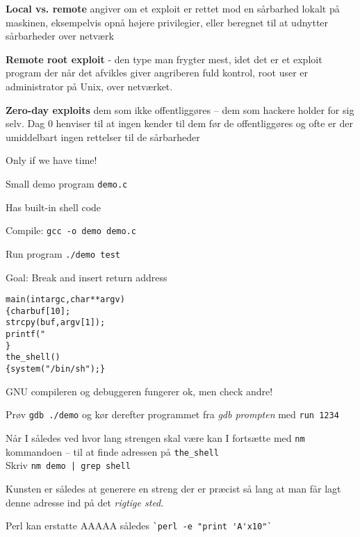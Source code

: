 \documentclass[Screen16to9,17pt]{foils}
\begin{document}
\begin{list1}
\item {\bfseries Local vs. remote}
angiver om et exploit er rettet mod
en sårbarhed lokalt på maskinen, eksempelvis
opnå højere privilegier, eller beregnet
til at udnytter sårbarheder over netværk
\item {\bfseries Remote root exploit}
- den type man frygter mest, idet
det er et exploit program der når det afvikles giver
angriberen fuld kontrol, root user er administrator
på Unix, over netværket.
\item {\bfseries Zero-day exploits} dem som ikke offentliggøres -- dem
  som hackere holder for sig selv. Dag 0 henviser til at ingen kender
  til dem før de offentliggøres og ofte er der umiddelbart ingen
  rettelser til de sårbarheder
\end{list1}





Only if we have time!

\begin{list2}
\item Small demo program \verb+demo.c+
\item Has built-in shell code
\item Compile:
\verb+gcc -o demo demo.c+
\item Run program
\verb+./demo test+
\item Goal: Break and insert return address
\end{list2}

\begin{alltt}\small
main(int argc, char **argv)
\{      char buf[10];
        strcpy(buf, argv[1]);
        printf("%s\textbackslash{}n",buf);
\}
the_shell()
\{  system("/bin/sh");  \}
\end{alltt}



\begin{list1}
\item GNU compileren og debuggeren fungerer ok, men check andre!
\item Prøv \verb+gdb ./demo+ og kør derefter programmet fra \emph{gdb prompten}
med  \verb+run 1234+
\item Når I således ved hvor lang strengen skal være kan I fortsætte
  med \verb+nm+ kommandoen -- til at finde adressen på
  \verb+the_shell+\\
Skriv \verb+nm demo | grep shell+

\item Kunsten er således at generere en streng der er præcist så lang
  at man får lagt denne adresse ind på det \emph{rigtige sted}.
\item Perl kan erstatte AAAAA således \verb+`perl -e "print 'A'x10"`+
\end{list1}
\end{document}
